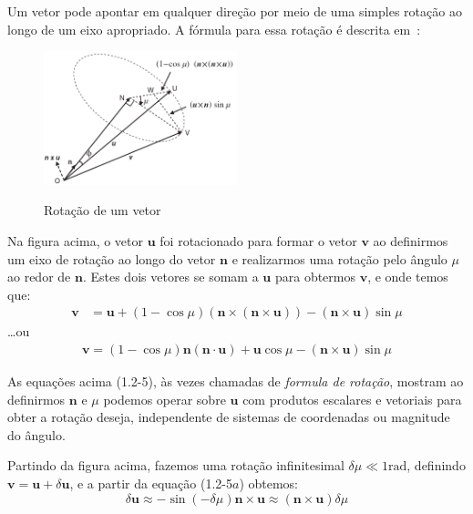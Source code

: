 Um vetor pode apontar em qualquer direção por meio de uma simples rotação ao longo de um eixo apropriado. A fórmula para essa rotação é descrita em~\cite{Goldstein1980}:

\begin{figure}[H]
    \centering
    \includegraphics[width=0.5\textwidth, keepaspectratio]{figuras/figure1.2-1.png}\label{fig1.2-1}
    \caption{Rotação de um vetor}
\end{figure}

Na figura acima, o vetor \(\mathbf{u}\) foi rotacionado para formar o vetor \(\mathbf{v}\) ao definirmos um eixo de rotação ao longo do vetor \(\mathbf{n}\) e realizarmos uma rotação pelo ângulo \(\mu\) ao redor de \(\mathbf{n}\). Estes dois vetores se somam a \(\mathbf{u}\) para obtermos \(\mathbf{v}\), e onde temos que:
    \begin{align*}
     \mathbf{v} &= \mathbf{u} + \left(1 - {\cos{\mu}}\right) \left(\mathbf{n}\!\times\!\left(\mathbf{n}\!\times\!\mathbf{u}\right)\right) - \left(\mathbf{n}\!\times\!\mathbf{u}\right){\sin{\mu}} \tag{1.2-5a}
    \end{align*}
    \ldots ou
    \begin{align*}
     \mathbf{v} = \left(1 - {\cos{\mu}}\right) \mathbf{n}\!\left(\mathbf{n}\cdot\mathbf{u}\right) + \mathbf{u}{\cos{\mu}} - \left(\mathbf{n}\!\times\!\mathbf{u}\right){\sin{\mu}} \tag{1.2-5b}
    \end{align*}

    As equações acima (1.2-5), às vezes chamadas de \textit{formula de rotação}, mostram ao definirmos \(\mathbf{n}\) e \(\mu\) podemos operar sobre \(\mathbf{u}\) com produtos escalares e vetoriais para obter a rotação deseja, independente de sistemas de coordenadas ou magnitude do ângulo.

    Partindo da figura acima, fazemos uma rotação infinitesimal \(\delta\mu \ll 1 \text{rad}\), definindo \(\mathbf{v} = \mathbf{u} + \delta \mathbf{u}\), e a partir da equação (1.2-5\(a\)) obtemos:
\begin{equation*}
    \delta \mathbf{u} \approx -\!\sin(-\delta\mu)\mathbf{n}\!\times\!\mathbf{u} \approx (\mathbf{n}\!\times\!\mathbf{u})\delta\mu
\end{equation*}

